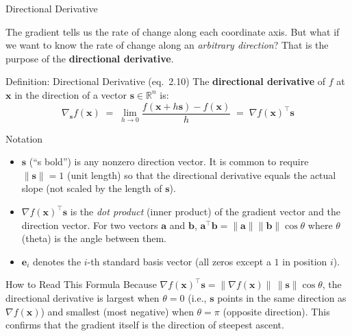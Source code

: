 \documentclass[aspectratio=169,10pt]{beamer}
\newcommand{\x}{\mathbf{x}}
\begin{document}
\begin{frame}[allowframebreaks]{Directional Derivative}

  The gradient tells us the rate of change along each coordinate axis.
  But what if we want to know the rate of change along an \emph{arbitrary
  direction}?  That is the purpose of the \textbf{directional derivative}.

  \begin{block}{Definition: Directional Derivative (eq.\ 2.10)}
    The \textbf{directional derivative} of $f$ at $\x$ in the direction
    of a vector $\mathbf{s} \in \mathbb{R}^n$ is:
    \[
      \nabla_{\mathbf{s}} f(\x)
      \;=\;
      \lim_{h\to 0}\frac{f(\x + h\mathbf{s}) - f(\x)}{h}
      \;=\;
      \nabla f(\x)^\top \mathbf{s}
    \]
  \end{block}

  \begin{block}{Notation}
    \begin{itemize}
      \item $\mathbf{s}$ (``s bold'') is any nonzero direction vector.
            It is common to require $\|\mathbf{s}\| = 1$ (unit length) so
            that the directional derivative equals the actual slope
            (not scaled by the length of $\mathbf{s}$).
      \item $\nabla f(\x)^\top \mathbf{s}$ is the \emph{dot product}
            (inner product) of the gradient vector and the direction vector.
            For two vectors $\mathbf{a}$ and $\mathbf{b}$,
            $\mathbf{a}^\top \mathbf{b} = \|\mathbf{a}\|\|\mathbf{b}\|\cos\theta$
            where $\theta$ (theta) is the angle between them.
      \item $\mathbf{e}_i$ denotes the $i$-th standard basis vector
            (all zeros except a $1$ in position $i$).
    \end{itemize}
  \end{block}

  \begin{alertblock}{How to Read This Formula}
    Because $\nabla f(\x)^\top \mathbf{s}
    = \|\nabla f(\x)\|\,\|\mathbf{s}\|\cos\theta$,
    the directional derivative is largest when $\theta = 0$
    (i.e., $\mathbf{s}$ points in the same direction as $\nabla f(\x)$)
    and smallest (most negative) when $\theta = \pi$ (opposite direction).
    This confirms that the gradient itself is the direction of steepest
    ascent.
  \end{alertblock}


\end{frame}
\end{document}
